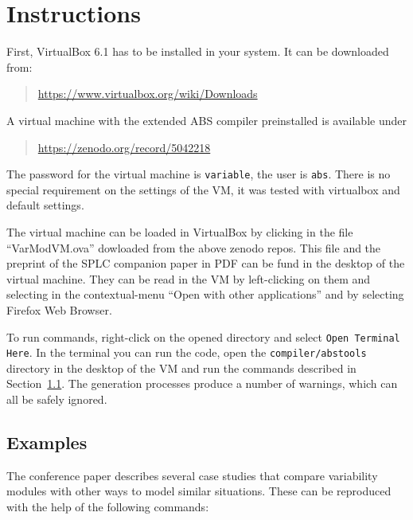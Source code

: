 \documentclass[runningheads]{llncs}
\begin{document}
\section{Instructions}

First, VirtualBox 6.1 has to be installed in your system. It can be downloaded from:
\begin{quote}
  \url{https://www.virtualbox.org/wiki/Downloads}
\end{quote}


A virtual machine with the extended ABS compiler preinstalled is available under 
\begin{quote}
\url{https://zenodo.org/record/5042218}
\end{quote}


The password for the virtual machine is \texttt{variable}, the user is \texttt{abs}. There is no special requirement on the settings of the VM, it was tested with virtualbox and default settings.

The virtual machine can be loaded in VirtualBox by clicking in the file ``VarModVM.ova'' dowloaded  from the above zenodo repos.
This file and the preprint of the SPLC companion paper in PDF can be fund in the desktop of the virtual machine.
They can be read in the VM by left-clicking on them and selecting in the contextual-menu ``Open with other applications'' and  by selecting Firefox Web Browser. 

To run commands, right-click on the opened directory and select \texttt{Open Terminal Here}.
In the terminal you can run the code, open the \texttt{compiler/abstools} directory in the desktop of the VM and run the commands described in Section~\ref{sec:examples}.
The generation processes produce a number of warnings, which can all be safely ignored.


\subsection{Examples}\label{sec:examples}


The conference paper \cite{new} describes several case studies that compare variability modules with other ways to model similar situations.
These can be reproduced with the help of the following commands:
\end{document}
